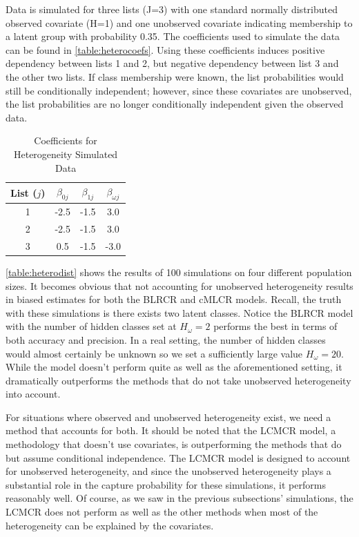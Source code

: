 \documentclass[
  12pt,
]{article}
\begin{document}
Data is simulated for three lists (J=3) with one standard normally
distributed observed covariate (H=1) and one unobserved covariate
indicating membership to a latent group with probability 0.35. The
coefficients used to simulate the data can be found in
\autoref{table:heterocoefs}. Using these coefficients induces positive
dependency between lists 1 and 2, but negative dependency between list 3
and the other two lists. If class membership were known, the list
probabilities would still be conditionally independent; however, since
these covariates are unobserved, the list probabilities are no longer
conditionally independent given the observed data.

\singlespacing
\begin{table}[H]
\centering
\begin{tabular}{||c c c c||} 
 \hline
 List ($j$) & $\beta_{0j}$ & $\beta_{1j}$ & $\beta_{\omega j}$   \\ [0.5ex] 
 \hline\hline
 1 & -2.5 &  -1.5  & 3.0 \\ 
 2 & -2.5 & -1.5  &  3.0 \\
 3 & 0.5 & -1.5  &  -3.0 \\
 \hline
\end{tabular}
\caption{Coefficients for Heterogeneity Simulated Data}
\label{table:heterocoefs}
\end{table}
\doublespacing

\autoref{table:heterodist} shows the results of 100 simulations on four
different population sizes. It becomes obvious that not accounting for
unobserved heterogeneity results in biased estimates for both the BLRCR
and cMLCR models. Recall, the truth with these simulations is there
exists two latent classes. Notice the BLRCR model with the number of
hidden classes set at \(H_\omega=2\) performs the best in terms of both
accuracy and precision. In a real setting, the number of hidden classes
would almost certainly be unknown so we set a sufficiently large value
\(H_\omega=20\). While the model doesn't perform quite as well as the
aforementioned setting, it dramatically outperforms the methods that do
not take unobserved heterogeneity into account.

For situations where observed and unobserved heterogeneity exist, we
need a method that accounts for both. It should be noted that the LCMCR
model, a methodology that doesn't use covariates, is outperforming the
methods that do but assume conditional independence. The LCMCR model is
designed to account for unobserved heterogeneity, and since the
unobserved heterogeneity plays a substantial role in the capture
probability for these simulations, it performs reasonably well. Of
course, as we saw in the previous subsections' simulations, the LCMCR
does not perform as well as the other methods when most of the
heterogeneity can be explained by the covariates.
\end{document}
